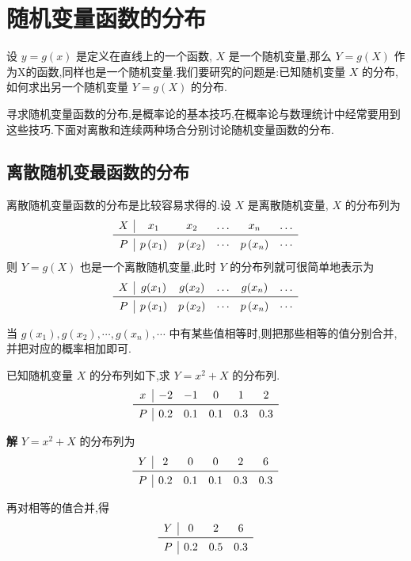 \section{随机变量函数的分布}\label{sec:2.6}

设 $ y=g(x) $ 是定义在直线上的一个函数, $ X $ 是一个随机变量,那么 $ Y=g(X) $ 作为X的函数,同样也是一个随机变量.我们要研究的问题是:已知随机变量 $ X $ 的分布,如何求出另一个随机变量 $ Y=g(X) $ 的分布.

寻求随机变量函数的分布,是概率论的基本技巧,在概率论与数理统计中经常要用到这些技巧.下面对离散和连续两种场合分别讨论随机变量函数的分布.

\subsection{离散随机变最函数的分布}\label{ssec:2.6.1}

离散随机变量函数的分布是比较容易求得的.设 $ X $ 是离散随机变量, $ X $ 的分布列为
\[
\begin{array}{c|ccccc}
{X} & {x_{1}} & {x_{2}} & {\dots} & {x_{n}} & {\dots} \\ \midrule 
P & {p\left(x_{1}\right)} & {p\left(x_{2}\right)} & {\cdots} & {p\left(x_{n}\right)} & {\cdots}
\end{array}
\]
则 $ Y=g(X) $ 也是一个离散随机变量,此时 $ Y $ 的分布列就可很简单地表示为
\[
\begin{array}{c|ccccc}
{X} & {g(x_{1})} & {g(x_{2})} & {\dots} & {g(x_{n})} & {\dots} \\ \midrule 
P & {p\left(x_{1}\right)} & {p\left(x_{2}\right)} & {\cdots} & {p\left(x_{n}\right)} & {\cdots}
\end{array}
\]

当 $ g\left(x_{1}\right), g\left(x_{2}\right), \cdots, g\left(x_{n}\right), \cdots $ 中有某些值相等时,则把那些相等的值分别合并,并把对应的概率相加即可.

\begin{example}\label{exam:2.6.1}
	已知随机变量 $ X $ 的分布列如下,求 $ Y=x^{2}+X $ 的分布列.
	\[
	\begin{array}{c|ccccc}
	x & {-2} & {-1} & {0} & {1} & {2} \\ \midrule
	P & {0.2} & {0.1} & {0.1} & {0.3} & {0.3} \\ 
	\end{array}
	\]
	
	\textbf{解} $ Y=x^{2}+X $ 的分布列为
	\[
	\begin{array}{c|ccccc}
	Y & {2} & {0} & {0} & {2} & {6} \\ \midrule 
	P & {0.2} & {0.1} & {0.1} & {0.3} & {0.3}
	\end{array}
	\]
	
	再对相等的值合并,得
	\[
	\begin{array}{c|ccc}
	Y & {0} & {2} & {6} \\ \midrule 
	P & {0.2} & {0.5} & {0.3} \\
	\end{array}
	\]
	
\end{example}

